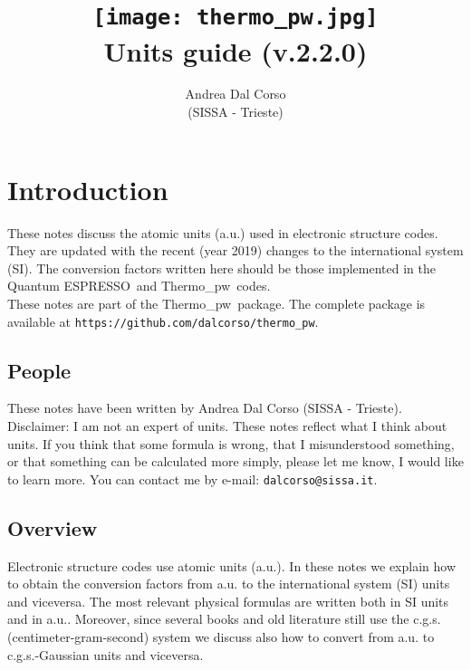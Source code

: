\documentclass[12pt,a4paper,twoside]{report}
\def\version{2.2.0}
\def\qe{{\sc Quantum ESPRESSO}}
\def\tpw{{\sc Thermo}\_{\sc pw}}
\begin{document}
 

\author{Andrea Dal Corso \\ (SISSA - Trieste)}
\date{}

\title{
  \texttt{[image: thermo\_pw.jpg]} \\
  \vspace{3truecm}
  \Huge \color{dark-blue} Units guide (v.\version)
}

\maketitle

\newpage

\color{dark-blue}
\tableofcontents
\color{black}

\newpage

{\color{dark-blue}\chapter{Introduction}}
\color{black}

These notes discuss the atomic units (a.u.) used in 
electronic structure codes. They are updated with the recent 
(year 2019) changes to the international system (SI).  
The conversion factors written here should be those implemented in
the \qe\ and \tpw\ codes. \\
These notes are part of the \tpw\ package. The complete package is
available at \texttt{https://github.com/dalcorso/thermo\_pw}.

\newpage
{\color{coral}\section{People}}
\color{black}
These notes have been written by Andrea Dal Corso (SISSA - Trieste). \\
Disclaimer: I am not an expert of units. 
These notes reflect what I think about units.
If you think that some formula is wrong, that I misunderstood something, or 
that something can be calculated more simply, please let me know, I would 
like to learn more. 
You can contact me by e-mail: \texttt{dalcorso@sissa.it}. 

\newpage
{\color{coral}\section{Overview}}
\color{black}
Electronic structure codes use atomic units (a.u.). 
In these notes we explain how to obtain the conversion factors 
from a.u. to the international system (SI) units and viceversa. 
The most relevant physical formulas are written both in SI units 
and in a.u.. Moreover, since several books and old literature still 
use the c.g.s. (centimeter-gram-second) system we discuss also how 
to convert from a.u. to c.g.s.-Gaussian units and viceversa.
\end{document}
